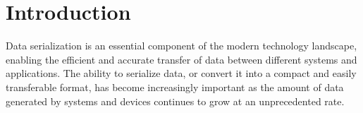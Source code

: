 \documentclass[conference]{IEEEtran}
\begin{document}

\section{Introduction}
Data serialization is an essential component of the modern technology landscape, enabling the efficient and accurate transfer of data between different systems and applications. The ability to serialize data, or convert it into a compact and easily transferable format, has become increasingly important as the amount of data generated by systems and devices continues to grow at an unprecedented rate.
\end{document}
